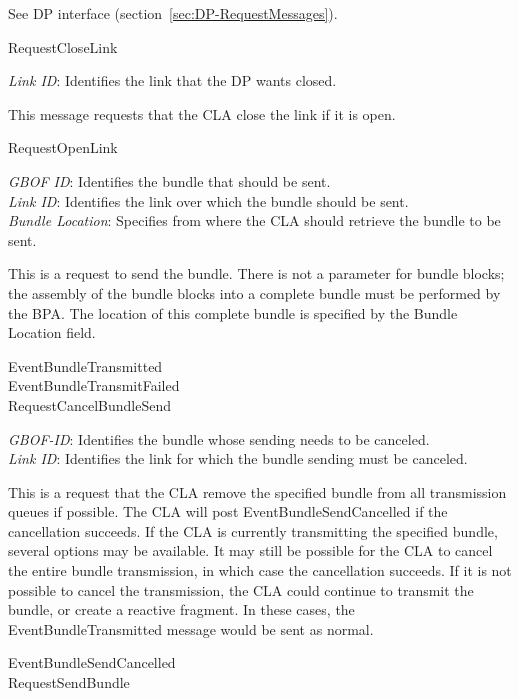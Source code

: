 {
\metD
    See DP interface (section~\ref{sec:DP-RequestMessages}).

\metR
    RequestCloseLink
}

{
\metP
    {\em Link ID}: Identifies the link that the DP wants closed.

\metD
    This message requests that the CLA close the link if it is open.

\metR
    RequestOpenLink
}

{
\metP
    {\em GBOF ID}: Identifies the bundle that should be sent.\\
    {\em Link ID}: Identifies the link over which the bundle should be sent.\\
    {\em Bundle Location}: Specifies from where the CLA should retrieve the
    bundle to be sent.

\metD
    This is a request to send the bundle. There is not a parameter for bundle
    blocks; the assembly of the bundle blocks into a complete bundle must
    be performed by the BPA. The location of this complete bundle is specified
    by the Bundle Location field.

\metR
    EventBundleTransmitted\\
    EventBundleTransmitFailed\\
    RequestCancelBundleSend
}

{
\metP
    {\em GBOF-ID}: Identifies the bundle whose sending needs to be canceled.\\
    {\em Link ID}: Identifies the link for which the bundle sending must be
    canceled.

\metD
    This is a request that the CLA remove the specified bundle from all
    transmission queues if possible. The CLA will post EventBundleSendCancelled
    if the cancellation succeeds. If the CLA is currently transmitting the
    specified bundle, several options may be available. It may still be
    possible for the CLA to cancel the entire bundle transmission, in which
    case the cancellation succeeds. If it is not possible to cancel the
    transmission, the CLA could continue to transmit the bundle, or create a
    reactive fragment. In these cases, the EventBundleTransmitted message would
    be sent as normal.

\metR
    EventBundleSendCancelled\\
    RequestSendBundle
}

